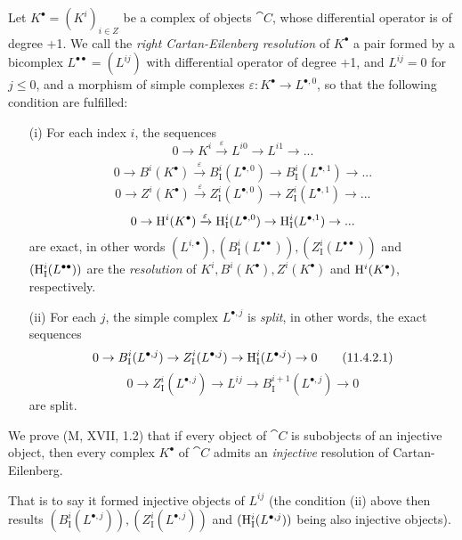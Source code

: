 \begin{env}[11.4.2]
\label{0.11.4.2}
Let $K^\bullet = (K^i)_{i\in Z}$ be a complex of objects $\cat{C}$, whose differential operator is of degree +1.
We call the \emph{right Cartan-Eilenberg resolution} of $K^\bullet$ a pair formed by a bicomplex $L^{\bullet\bullet} = (L^{ij})$
with differential operator of degree +1, and $L^{ij}=0$ for $j\leq 0$, and a morphism of simple complexes $\varepsilon: K^\bullet \rightarrow L^{\bullet, 0}$,
so that the following condition are fulfilled:
\begin{enumerate}
  \item[(i)] For each index $i$, the sequences
  \[
    0 \rightarrow K^i \xrightarrow[]{\varepsilon} L^{i0} \rightarrow L^{i1} \rightarrow ...
  \]
  \[
    0 \rightarrow B^i(K^\bullet) \xrightarrow[]{\varepsilon} B_\mathrm{I}^i(L^{\bullet,0}) \rightarrow B_\mathrm{I}^i(L^{\bullet,1}) \rightarrow ...
  \]
  \[
    0 \rightarrow Z^i(K^\bullet) \xrightarrow[]{\varepsilon} Z_\mathrm{I}^i(L^{\bullet,0}) \rightarrow Z_\mathrm{I}^i(L^{\bullet,1}) \rightarrow ...
  \]
  \[
    0 \rightarrow \mathrm{H}^i(K^\bullet) \xrightarrow[]{\varepsilon} \mathrm{H}_\mathrm{I}^i(L^{\bullet,0}) \rightarrow \mathrm{H}_\mathrm{I}^i(L^{\bullet,1}) \rightarrow ...
  \]
  are exact, in other words $(L^{i,\bullet}), (B_\mathrm{I}^i(L^{\bullet\bullet})), (Z_\mathrm{I}^i(L^{\bullet\bullet}))$ and $(\mathrm{H}_\mathrm{I}^i(L^{\bullet\bullet}))$ 
  are the \emph{resolution} of $K^i, B^i(K^\bullet), Z^i(K^\bullet)$ and $\mathrm{H}^i(K^\bullet)$, respectively.
  \item[(ii)] For each $j$, the simple complex $L^{\bullet, j}$ is \emph{split}, in other words, the exact sequences
  \[
    \label{0.11.4.2.1}
    0 \rightarrow B_\mathrm{I}^i(L^{\bullet,j}) \rightarrow Z_\mathrm{I}^i(L^{\bullet,j}) \rightarrow \mathrm{H}_\mathrm{I}^i(L^{\bullet,j}) \rightarrow 0
    \tag{11.4.2.1}
  \]
  \[
    \label{0.11.4.2.2}
    0 \rightarrow Z_\mathrm{I}^i(L^{\bullet,j}) \rightarrow L^{ij} \rightarrow B_\mathrm{I}^{i+1}(L^{\bullet,j}) \rightarrow 0
    \tag{11.4.2.2}
  \]
  are split.
\end{enumerate}
We prove (M, XVII, 1.2) that if every object of $\cat{C}$ is subobjects of an injective object, 
then every complex $K^\bullet$ of $\cat{C}$ admits an \emph{injective} resolution of Cartan-Eilenberg.

That is to say it formed injective objects of $L^{ij}$ 
(the condition (ii) above then results $(B_\mathrm{I}^i(L^{\bullet,j})), (Z_\mathrm{I}^i(L^{\bullet,j}))$ and $(\mathrm{H}_\mathrm{I}^i(L^{\bullet,j}))$ being also injective objects).


\end{env}

